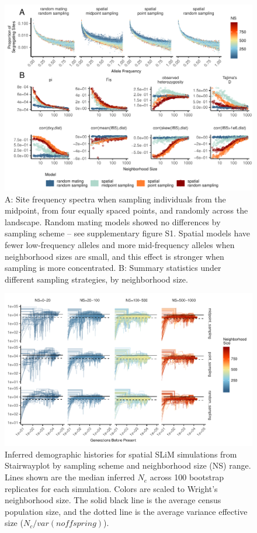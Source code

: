 \documentclass[9pt,twocolumn,twoside,lineno]{gsajnl}
\begin{document}
\begin{figure}[p]
\centering
\includegraphics[width=\textwidth]{sfs_w_sumstats.pdf}
\caption{A: Site frequency spectra when sampling individuals from the midpoint, from four equally spaced points, and randomly across the landscape. Random mating models showed no differences by sampling scheme -- see supplementary figure S1. Spatial models have fewer low-frequency alleles and more mid-frequency alleles when neighborhood sizes are small, and this effect is stronger when sampling is more concentrated. B: Summary statistics under different sampling strategies, by neighborhood size.}
\label{fig:spectrum}
\end{figure}

\afterpage{\clearpage}
\begin{figure}[p]
\centering
\includegraphics[width=\textwidth]{stairwayplot_by_sigma_facet_sampling_by_bin.pdf}
\caption{Inferred demographic histories for spatial SLiM simulations from Stairwayplot by sampling scheme and neighborhood size (NS) range. Lines shown are the median inferred $N_{e}$ across 100 bootstrap replicates for each simulation. Colors are scaled to Wright's neighborhood size. The solid black line is the average census population size, and the dotted line is the average variance effective size ($N_{c}/var(n offspring)$).}
\label{fig:spectrum}
\end{figure}
\end{document}
